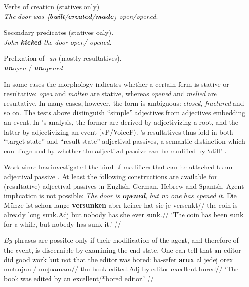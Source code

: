 \ex Verbs of creation (statives only).\\
	\emph{The door was \{\textbf{built}/\textbf{created}/\textbf{made}\} \cmark open/\xmark opened}.
\xe

\ex Secondary predicates (statives only).\\
	\emph{John \textbf{kicked} the door \cmark open/ \xmark opened}.
\xe

\ex Prefixation of -\emph{un} (mostly resultatives).\\
	\xmark \emph{\textbf{un}open} / \cmark \emph{\textbf{un}opened}
\xe

In some cases the morphology indicates whether a certain form is stative or resultative: \emph{open} and \emph{molten} are stative, whereas \emph{opened} and \emph{melted} are resultative. In many cases, however, the form is ambiguous: \emph{closed}, \emph{fractured} and so on. The tests above distinguish ``simple'' adjectives from adjectives embedding an event. In \citeauthor{embick04li}'s analysis, the former are derived by adjectivizing a root, and the latter by adjectivizing an event (vP/VoiceP). \citeauthor{embick04li}'s resultatives thus fold in both ``target state'' and ``result state'' adjectival passives, a semantic distinction which can diagnosed by whether the adjectival passive can be modified by `still' \citep{kratzer00bls,alexiadouetal14}.

Work since has investigated the kind of modifiers that can be attached to an adjectival passive \citep{meltzerasscher11,mcintyre13,alexiadouetal14,bruening14nllt,gehrkemarco14}. At least the following constructions are available for (resultative) adjectival passives in English, German, Hebrew and Spanish{. Agent implication is not possible:}
\pex
	\a \ljudge{*} \emph{The door is \textbf{opened}, but no one has opened it}.
	\a \ljudge{*} \begingl
		\gla Die M\"unze ist schon lange \textbf{versunken} aber keiner hat sie je versenkt//
		\glb the coin is already long sunk.Adj but nobody has she ever sunk.//
		\glft `The coin has been sunk for a while, but nobody has sunk it.' //
	\endgl
\xe

\emph{By}-phrases are possible only if their modification of the agent, and therefore of the event, is discernible by examining the end state. One can tell that an editor did good work but not that the editor was bored:
\ex
	\begingl
		\gla ha-sefer \textbf{arux} {al jedej} orex {\cmark}metsujan / {\xmark}meʃoamam//
		\glb the-book edited.Adj by editor \phantom{\cmark}excellent {} \phantom{\xmark}bored//
		\glft `The book was edited by an excellent/*bored editor.' //
	\endgl
\xe

